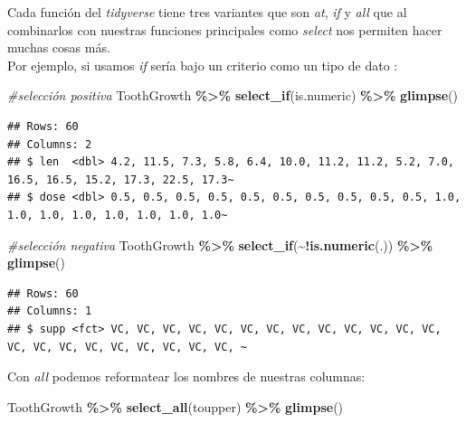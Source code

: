 \documentclass[
]{book}
\newenvironment{Shaded}{\begin{snugshade}}{\end{snugshade}}
\newcommand{\CommentTok}[1]{\textcolor[rgb]{0.56,0.35,0.01}{\textit{#1}}}
\newcommand{\FunctionTok}[1]{\textcolor[rgb]{0.13,0.29,0.53}{\textbf{#1}}}
\newcommand{\NormalTok}[1]{#1}
\newcommand{\SpecialCharTok}[1]{\textcolor[rgb]{0.81,0.36,0.00}{\textbf{#1}}}
\begin{document}
\hfill\break
Cada función del \emph{tidyverse} tiene tres variantes que son \emph{at}, \emph{if} y \emph{all} que al combinarlos con nuestras funciones principales como \emph{select} nos permiten hacer muchas cosas más.\\
Por ejemplo, si usamos \emph{if} sería bajo un criterio como un tipo de dato
:\\

\begin{Shaded}
\begin{Highlighting}[]
\CommentTok{\#selección positiva}
\NormalTok{ToothGrowth }\SpecialCharTok{\%\textgreater{}\%} \FunctionTok{select\_if}\NormalTok{(is.numeric) }\SpecialCharTok{\%\textgreater{}\%} \FunctionTok{glimpse}\NormalTok{()}
\end{Highlighting}
\end{Shaded}

\begin{verbatim}
## Rows: 60
## Columns: 2
## $ len  <dbl> 4.2, 11.5, 7.3, 5.8, 6.4, 10.0, 11.2, 11.2, 5.2, 7.0, 16.5, 16.5, 15.2, 17.3, 22.5, 17.3~
## $ dose <dbl> 0.5, 0.5, 0.5, 0.5, 0.5, 0.5, 0.5, 0.5, 0.5, 0.5, 1.0, 1.0, 1.0, 1.0, 1.0, 1.0, 1.0, 1.0~
\end{verbatim}

\begin{Shaded}
\begin{Highlighting}[]
\CommentTok{\#selección negativa}
\NormalTok{ToothGrowth }\SpecialCharTok{\%\textgreater{}\%} \FunctionTok{select\_if}\NormalTok{(}\SpecialCharTok{\textasciitilde{}!}\FunctionTok{is.numeric}\NormalTok{(.)) }\SpecialCharTok{\%\textgreater{}\%} \FunctionTok{glimpse}\NormalTok{()}
\end{Highlighting}
\end{Shaded}

\begin{verbatim}
## Rows: 60
## Columns: 1
## $ supp <fct> VC, VC, VC, VC, VC, VC, VC, VC, VC, VC, VC, VC, VC, VC, VC, VC, VC, VC, VC, VC, VC, VC, ~
\end{verbatim}

\hfill\break
Con \emph{all} podemos reformatear los nombres de nuestras columnas:

\begin{Shaded}
\begin{Highlighting}[]
\NormalTok{ToothGrowth }\SpecialCharTok{\%\textgreater{}\%} \FunctionTok{select\_all}\NormalTok{(toupper) }\SpecialCharTok{\%\textgreater{}\%} \FunctionTok{glimpse}\NormalTok{()}
\end{Highlighting}
\end{Shaded}
\end{document}
